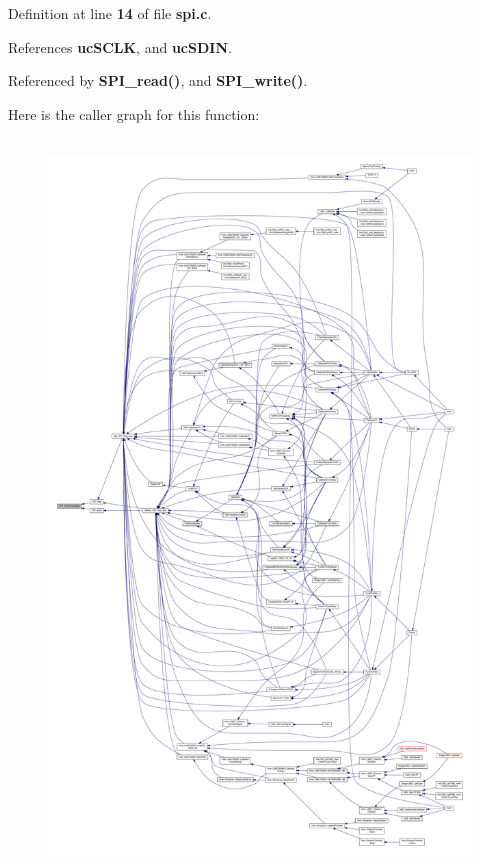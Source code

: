 Definition at line {\bf 14} of file {\bf spi.\+c}.



References {\bf uc\+S\+C\+LK}, and {\bf uc\+S\+D\+IN}.



Referenced by {\bf S\+P\+I\+\_\+read()}, and {\bf S\+P\+I\+\_\+write()}.



Here is the caller graph for this function\+:
\nopagebreak
\begin{figure}[H]
\begin{center}
\leavevmode
\includegraphics[height=550pt]{da/d00/spi_8c_a876db267d7b943f993f9c33ca159d250_icgraph}
\end{center}
\end{figure}


